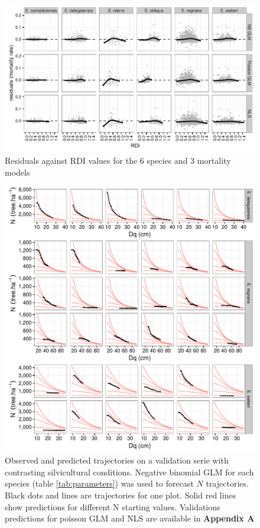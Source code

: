 \documentclass[12pt,english]{article}
\begin{document}
\begin{figure}%
	\centering
	\includegraphics[width=16cm]{fig5.pdf}
	\caption{Residuals against RDI values for the 6 species and 3 mortality models}
	\label{fig:res_rdi}
\end{figure}
	
\begin{figure}%
	\centering
	\includegraphics[width=16cm]{fig6.pdf}
	\caption{Observed and predicted trajectories on a validation serie with contrasting silvicultural conditions. Negative binomial GLM for each species (table \ref{tab:parameters}) was used to forecast $N$ trajectories. Black dots and lines are trajectories for one plot. Solid red lines show predictions for different N starting values. Validations predictions for poisson GLM and NLS are available in \textbf{Appendix A}}
	\label{fig:validation}
\end{figure}
\end{document}
